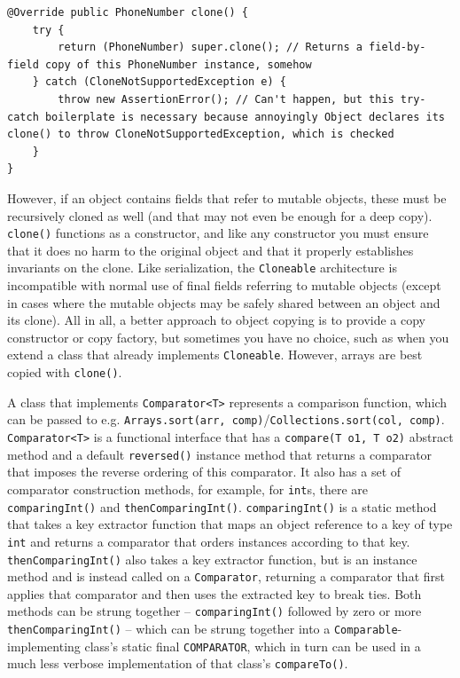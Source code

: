 \documentclass[table, xcdraw]{article}%
\begin{document}
\begin{verbatim}
@Override public PhoneNumber clone() { 
	try {
		return (PhoneNumber) super.clone(); // Returns a field-by-field copy of this PhoneNumber instance, somehow
	} catch (CloneNotSupportedException e) {
		throw new AssertionError(); // Can't happen, but this try-catch boilerplate is necessary because annoyingly Object declares its clone() to throw CloneNotSupportedException, which is checked
	}
}
\end{verbatim}

However, if an object contains fields that refer to mutable objects, these must be recursively cloned as well (and that may not even be enough for a deep copy). \texttt{clone()} functions as a constructor, and like any constructor you must ensure that it does no harm to the original object and that it properly establishes invariants on the clone. Like serialization, the \texttt{Cloneable} architecture is incompatible with normal use of final fields referring to mutable objects (except in cases where the mutable objects may be safely shared between an object and its clone). All in all, a better approach to object copying is to provide a copy constructor or copy factory, but sometimes you have no choice, such as when you extend a class that already implements \texttt{Cloneable}. However, arrays are best copied with \texttt{clone()}.

A class that implements \texttt{Comparator<T>} represents a comparison function, which can be passed to e.g. \texttt{Arrays.sort(arr, comp)}/\texttt{Collections.sort(col, comp)}. \texttt{Comparator<T>} is a functional interface that has a \texttt{compare(T o1, T o2)} abstract method and a default \texttt{reversed()} instance method that returns a comparator that imposes the reverse ordering of this comparator. It also has a set of comparator construction methods, for example, for \texttt{int}s, there are \texttt{comparingInt()} and \texttt{thenComparingInt()}. \texttt{comparingInt()} is a static method that takes a key extractor function that maps an object reference to a key of type \texttt{int} and returns a comparator that orders instances according to that key. \texttt{thenComparingInt()} also takes a key extractor function, but is an instance method and is instead called on a \texttt{Comparator}, returning a comparator that first applies that comparator and then uses the extracted key to break ties. Both methods can be strung together -- \texttt{comparingInt()} followed by zero or more \texttt{thenComparingInt()} -- which can be strung together into a \texttt{Comparable}-implementing class's static final \texttt{COMPARATOR}, which in turn can be used in a much less verbose implementation of that class's \texttt{compareTo()}.
\end{document}
